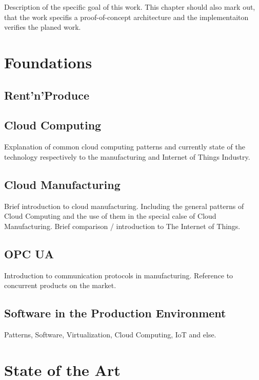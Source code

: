 \documentclass[
a4paper,
twoside,
bibliography=totoc,
headsepline,
cleardoublepage=empty,
parskip=half,
draft=false
]{scrbook}
\begin{document}
			Description of the specific goal of this work. This chapter should also mark out, that the work specifis a proof-of-concept architecture and the implementaiton verifies the planed work.
			
	\chapter{Foundations}\label{ch:foundations}
	
		\section{Rent'n'Produce}\label{sec:rent_n_produce}
		
		\section{Cloud Computing}\label{sec:cloud_computing}
		
			Explanation of common cloud computing patterns and currently state of the technology respectively to the manufacturing and Internet of Things Industry.~\cite{mell2011nist}
		
		\section{Cloud Manufacturing}\label{sec:cloud_manufacturing}
		
			Brief introduction to cloud manufacturing. Including the general patterns of Cloud Computing and the use of them in the special calse of Cloud Manufacturing. Brief comparison / introduction to The Internet of Things.
		
		\section{OPC UA} \label{sec:opc_ua}
		
			Introduction to communication protocols in manufacturing. Reference to concurrent products on the market.
			
		\section{Software in the Production Environment}\label{subsec:software_in_the_production_environment}
		
			Patterns, Software, Virtualization, Cloud Computing, IoT and else.
		
	\chapter{State of the Art}\label{ch:state_of_the_art}
			
\end{document}
